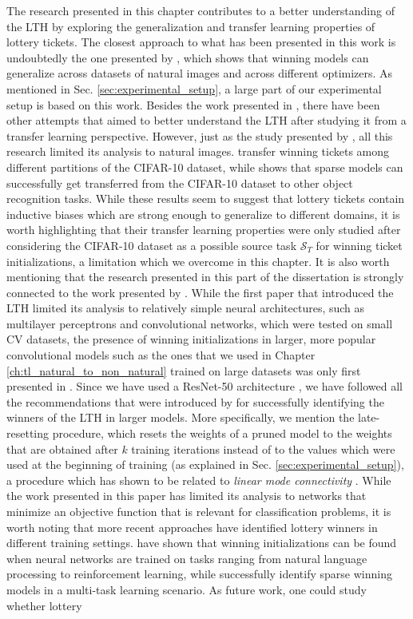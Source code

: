 The research presented in this chapter contributes to a better understanding of the LTH by exploring the generalization and transfer learning properties of lottery tickets. The closest approach to what has been presented in this work is undoubtedly the one presented by \citet{morcos2019one}, which shows that winning models can generalize across datasets of natural images and across different optimizers. As mentioned in Sec. \ref{sec:experimental_setup}, a large part of our experimental setup is based on this work. Besides the work presented in \cite{morcos2019one}, there have been other attempts that aimed to better understand the LTH after studying it from a transfer learning perspective. However, just as the study presented by \citet{morcos2019one}, all this research limited its analysis to natural images. \citet{van2019using} transfer winning tickets among different partitions of the CIFAR-10 dataset, while \citet{mehta2019sparse} shows that sparse models can successfully get transferred from the CIFAR-10 dataset to other object recognition tasks. While these results seem to suggest that lottery tickets contain inductive biases which are strong enough to generalize to different domains, it is worth highlighting that their transfer learning properties were only studied after considering the CIFAR-10 dataset as a possible source task $\mathcal{S}_T$ for winning ticket initializations, a limitation which we overcome in this chapter. It is also worth mentioning that the research presented in this part of the dissertation is strongly connected to the work presented by \citet{franklestabilizing}. While the first paper that introduced the LTH limited its analysis to relatively simple neural architectures, such as multilayer perceptrons and convolutional networks, which were tested on small CV datasets, the presence of winning initializations in larger, more popular convolutional models such as the ones that we used in Chapter \ref{ch:tl_natural_to_non_natural} trained on large datasets \cite{russakovsky2015imagenet} was only first presented in \cite{franklestabilizing}. Since we have used a ResNet-50 architecture \cite{he2016deep}, we have followed all the recommendations that were introduced by \citet{franklestabilizing} for successfully identifying the winners of the LTH in larger models. More specifically, we mention the late-resetting procedure, which resets the weights of a pruned model to the weights that are obtained after $k$ training iterations instead of to the values which were used at the beginning of training (as explained in Sec. \ref{sec:experimental_setup}), a procedure which has shown to be related to \textit{linear mode connectivity} \cite{frankle2019linear}. While the work presented in this paper has limited its analysis to networks that minimize an objective function that is relevant for classification problems, it is worth noting that more recent approaches have identified lottery winners in different training settings. \citet{yu2019playing} have shown that winning initializations can be found when neural networks are trained on tasks ranging from natural language processing to reinforcement learning, while \citet{sun2019learning} successfully identify sparse winning models in a multi-task learning scenario. As future work, one could study whether lottery 